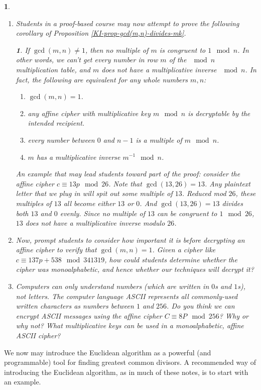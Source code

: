 \documentclass[11pt]{article}
\theoremstyle{plain}
\theoremstyle{remark}
\theoremstyle{definition}
\theoremstyle{definition}
\theoremstyle{definition}
\theoremstyle{plain}
\newtheorem{cor}[thm]{\protect\corollaryname}
\theoremstyle{plain}
\theoremstyle{plain}
\newtheorem{act}[thm]{\protect\activityname}
\theoremstyle{definition}
\providecommand{\corollaryname}{Corollary}
\providecommand{\activityname}{Activity}
\begin{document}
\begin{act}
\begin{enumerate}
\item Students in a proof-based course may now attempt to prove the following
corollary of Proposition \ref{KI-prop-gcd(m,n)-divides-mk}.
\begin{cor}
If $\gcd(m,n)\neq1$, then no multiple of $m$ is congruent to $1\mod n$.
In other words, we can't get every number in row $m$ of the $\mod n$
multiplication table, and \textit{$m$ }does not have a multiplicative
inverse\textit{ $\mod n$.} In fact, the following are equivalent
for any whole numbers $m,n$:
\begin{enumerate}
\item $\gcd(m,n)=1$.
\item any affine cipher with multiplicative key $m\mod n$ is decryptable
by the intended recipient.
\item every number between $0$ and $n-1$ is a multiple of $m\mod n$.
\item $m$ has a multiplicative inverse $m^{-1}\mod n$.
\end{enumerate}
\end{cor}

An example that may lead students toward part of the proof: consider
the affine cipher $c\equiv13p\mod26$. Note that $\gcd(13,26)=13$.
Any plaintext letter that we plug in will spit out some multiple of
$13$. Reduced mod $26$, these multiples of $13$ all become either
$13$ or $0$. And $\gcd(13,26)=13$ divides both $13$ and $0$ evenly.
Since no multiple of $13$ can be congruent to $1\mod26$, $13$ does
not have a multiplicative inverse modulo $26$.

\item Now, prompt students to consider how important it is before decrypting
an affine cipher to verify that $\gcd(m,n)=1$. Given a cipher like
$c\equiv137p+538\mod341319$, how could students determine whether
the cipher was monoalphabetic, and hence whether our techniques will
decrypt it? 

\item Computers can only understand numbers (which are written in $0$s and $1$s), not letters. The computer language ASCII represents all commonly-used written characters as numbers between $1$ and $256$. Do you think we can encrypt ASCII messages using the affine cipher $C\equiv8P\mod256$? Why or why not? What multiplicative keys can be used in a monoalphabetic, affine ASCII cipher?
\end{enumerate}
\end{act}

We now may introduce the Euclidean algorithm as a powerful
(and programmable) tool for finding greatest common divisors. A recommended way of introducing the Euclidean algorithm, as in much
of these notes, is to start with an example. 
\end{document}
